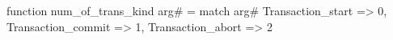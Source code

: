function num_of_trans_kind arg# = match arg# {
  Transaction_start => 0,
  Transaction_commit => 1,
  Transaction_abort => 2
}
